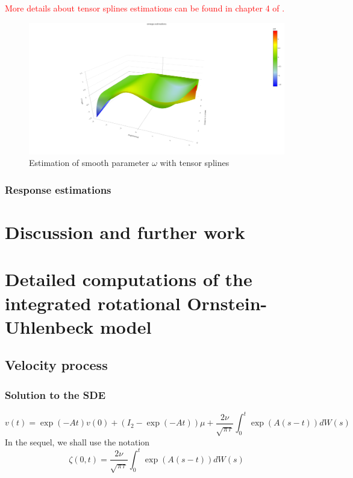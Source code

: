 \documentclass[11pt]{article}
\newcommand {\1}{\mathbb{1}}
\begin{document}
\textcolor{red}{More details about tensor splines estimations can be found in chapter 4 of \cite{wood_generalized_2017}.}

\begin{figure}[H]
	\centering
	\includegraphics[width=0.7\linewidth]{images/constrained_models/omega_estimations}
	\caption{Estimation of smooth parameter $\omega$ with tensor splines}
	\label{fig:omegaestimations}
\end{figure}



\subsubsection{Response estimations}



\section{Discussion and further work}

\newpage

\printbibliography

\newpage 

\appendix

\section{Detailed computations of the integrated rotational Ornstein-Uhlenbeck model}
\label{section: detailed RACVM computations}

\subsection{Velocity process}

\subsubsection{Solution to the SDE}

\begin{equation}
	v(t)=\exp(-At) v(0)+ (I_2-\exp(-At))\mu +\frac{2\nu}{\sqrt{\pi \tau}}\int_{0}^{t} \exp(A(s-t)) dW(s)
	\label{eq: RACVM solution}
\end{equation}
In the sequel, we shall use the notation 
\[\zeta(0,t) =\frac{2\nu}{\sqrt{\pi \tau}}\int_{0}^{t} \exp(A(s-t)) dW(s)\] 
\end{document}
